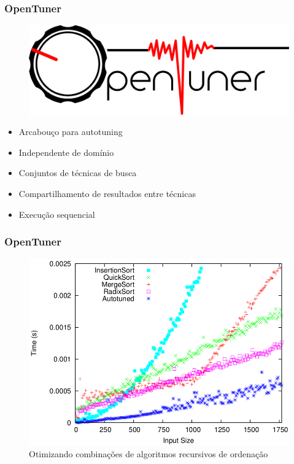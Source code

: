 \documentclass[10pt, compress]{beamer}
\begin{document}
\begin{frame}[fragile]
    \frametitle{OpenTuner}
    \begin{figure}[H]
        \centering
        \includegraphics[width=.34\textwidth]{opentuner-logo}
    \end{figure}%
    \begin{itemize}
        \item \alert{Arcabouço} para autotuning
        \item \alert{Independente} de domínio
        \item \alert{Conjuntos} de técnicas de busca
        \item \alert{Compartilhamento} de resultados entre técnicas
        \item Execução \alert{sequencial}
    \end{itemize}
    \let\thefootnote\relax{}
\end{frame}

\begin{frame}[fragile]
    \frametitle{OpenTuner}
    \begin{figure}[H]
        \centering
        \includegraphics[width=.8\textwidth]{sorting}
        \caption{Otimizando combinações de algoritmos recursivos de ordenação}
    \end{figure}%
    \let\thefootnote\relax{}
\end{frame}
\end{document}
